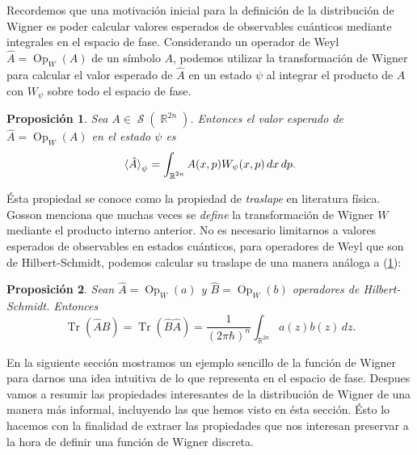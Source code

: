 \documentclass[a4paper]{report}
\DeclareMathOperator{\R}{\mathbb{R}}
\DeclareMathOperator{\Sz}{\mathcal S}
\DeclareMathOperator{\Tr}{Tr}
\DeclareMathOperator{\Op}{Op}
\newtheorem{proposition}{Proposición}
\begin{document}
  Recordemos que una motivación inicial para la definición
  de la distribución de Wigner es poder calcular valores
  esperados de observables cuánticos mediante integrales en
  el espacio de fase. Considerando un operador de Weyl $\hat
  A = \Op_W(A)$ de un símbolo $A$, podemos utilizar la
  transformación de Wigner para calcular el valor esperado
  de $\hat A$ en un estado $\psi$ al integrar el producto de
  $A$ con $W_\psi$ sobre todo el espacio de fase.
  \begin{proposition}
    \label{prop:wigner-weyl}
    Sea $A \in \Sz(\R^{2n})$. Entonces el valor esperado de
    $\hat A = \Op_W(A)$ en el estado $\psi$ es
    \begin{equation}
      \braket{\hat{A}}_\psi
      = \int_{\R^{2n}} A(x,p)W_\psi(x,p) \, dx \, dp.
    \end{equation}
  \end{proposition}
  Ésta propiedad se conoce como la propiedad de
  \textit{traslape} en literatura física.  Gosson menciona
  que muchas veces se \textit{define} la transformación de
  Wigner $W$ mediante el producto interno anterior. No es
  necesario limitarnos a valores esperados de observables en
  estados cuánticos, para operadores de Weyl que son de
  Hilbert-Schmidt, podemos calcular su traslape de una
  manera análoga a (\ref{prop:wigner-weyl}):
  \begin{proposition}
    Sean $\hat{A} = \Op_W(a)$ y $\hat{B} = \Op_W(b)$
    operadores de Hilbert-Schmidt. Entonces
    \begin{equation}
      \Tr\left( \hat{A}\hat{B} \right) 
      = \Tr\left( \hat{B}\hat{A} \right) 
      = \frac{1}{(2\pi\hbar)^{n}} \int_{\R^{2n}} a(z)b(z) \,
      dz.
    \end{equation}
  \end{proposition}
  En la siguiente sección mostramos un ejemplo sencillo de
  la función de Wigner para darnos una idea intuitiva de lo
  que representa en el espacio de fase. Despues vamos a
  resumir las propiedades interesantes de la distribución de
  Wigner de una manera más informal, incluyendo las que
  hemos visto en ésta sección. Ésto lo hacemos con la
  finalidad de extraer las propiedades que nos interesan
  preservar a la hora de definir una función de Wigner
  discreta.
\end{document}
